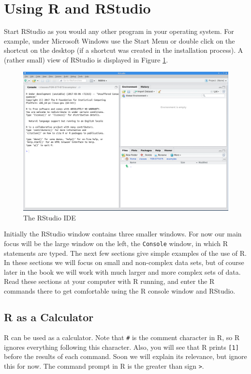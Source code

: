 \documentclass[]{krantz}
\begin{document}
\section{Using R and RStudio}\label{using-r-and-rstudio}

Start RStudio as you would any other program in your operating system.
For example, under Microsoft Windows use the Start Menu or double click
on the shortcut on the desktop (if a shortcut was created in the
installation process). A (rather small) view of RStudio is displayed in
Figure \ref{fig:rstudioPic}.

\begin{figure}
\includegraphics[width=1\linewidth]{../figures/RStudio} \caption{The RStudio IDE}\label{fig:rstudioPic}
\end{figure}

Initially the RStudio window contains three smaller windows. For now our
main focus will be the large window on the left, the \texttt{Console}
window, in which R statements are typed. The next few sections give
simple examples of the use of R. In these sections we will focus on
small and non-complex data sets, but of course later in the book we will
work with much larger and more complex sets of data. Read these sections
at your computer with R running, and enter the R commands there to get
comfortable using the R console window and RStudio.

\subsection{R as a Calculator}\label{r-as-a-calculator}

R can be used as a calculator. Note that \texttt{\#} is the comment
character in R, so R ignores everything following this character. Also,
you will see that R prints \texttt{{[}1{]}} before the results of each
command. Soon we will explain its relevance, but ignore this for now.
The command prompt in R is the greater than sign
\texttt{\textgreater{}}.
\end{document}
